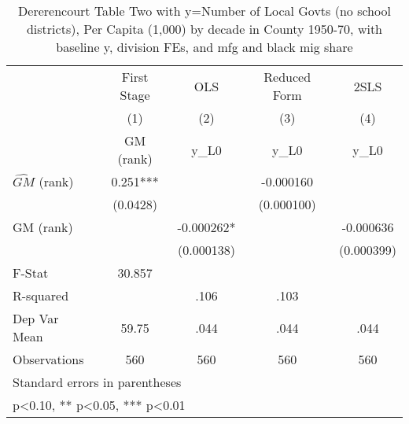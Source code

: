 \begin{table}[htbp]\centering
\def\sym#1{\ifmmode^{#1}\else\(^{#1}\)\fi}
\caption{Dererencourt Table Two with y=Number of Local Govts (no school districts), Per Capita (1,000) by decade in County 1950-70, with baseline y, division FEs, and mfg and black mig share}
\begin{tabular}{l*{4}{c}}
\toprule
                    & First Stage   &         OLS   &Reduced Form   &        2SLS   \\
                    &\multicolumn{1}{c}{(1)}&\multicolumn{1}{c}{(2)}&\multicolumn{1}{c}{(3)}&\multicolumn{1}{c}{(4)}\\
                    &\multicolumn{1}{c}{GM  (rank)}&\multicolumn{1}{c}{y\_L0}&\multicolumn{1}{c}{y\_L0}&\multicolumn{1}{c}{y\_L0}\\
\midrule
$\hat{GM}$ (rank)   &       0.251***&               &   -0.000160   &               \\
                    &    (0.0428)   &               &  (0.000100)   &               \\
\addlinespace
GM  (rank)          &               &   -0.000262*  &               &   -0.000636   \\
                    &               &  (0.000138)   &               &  (0.000399)   \\
\midrule
F-Stat              &      30.857   &               &               &               \\
R-squared           &               &        .106   &        .103   &               \\
Dep Var Mean        &       59.75   &        .044   &        .044   &        .044   \\
Observations        &         560   &         560   &         560   &         560   \\
\bottomrule
\multicolumn{5}{l}{\footnotesize Standard errors in parentheses}\\
\multicolumn{5}{l}{\footnotesize * p<0.10, ** p<0.05, *** p<0.01}\\
\end{tabular}
\end{table}
